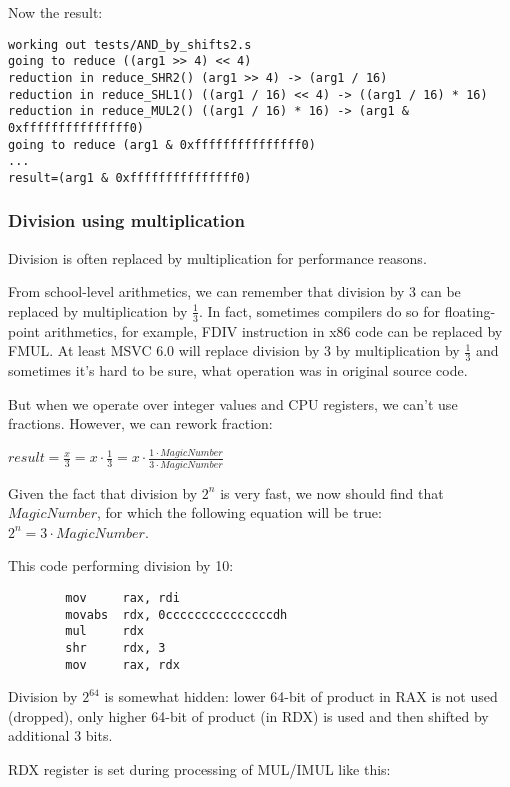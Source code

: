 Now the result:

\begin{lstlisting}
working out tests/AND_by_shifts2.s
going to reduce ((arg1 >> 4) << 4)
reduction in reduce_SHR2() (arg1 >> 4) -> (arg1 / 16)
reduction in reduce_SHL1() ((arg1 / 16) << 4) -> ((arg1 / 16) * 16)
reduction in reduce_MUL2() ((arg1 / 16) * 16) -> (arg1 & 0xfffffffffffffff0)
going to reduce (arg1 & 0xfffffffffffffff0)
...
result=(arg1 & 0xfffffffffffffff0)
\end{lstlisting}

\subsubsection{Division using multiplication}

Division is often replaced by multiplication for performance reasons.

From school-level arithmetics, we can remember that division by 3 can be replaced by multiplication by $\frac{1}{3}$.
In fact, sometimes compilers do so for floating-point arithmetics, for example, FDIV instruction in x86 code
can be replaced by FMUL.
At least MSVC 6.0 will replace division by 3 by multiplication by $\frac{1}{3}$ and sometimes it's hard to be sure,
what operation was in original source code.

But when we operate over integer values and CPU registers, we can't use fractions.
However, we can rework fraction:

\begin{center}
{\large $result = \frac{x}{3} = x \cdot \frac{1}{3} = x \cdot \frac{1 \cdot MagicNumber}{3 \cdot MagicNumber}$}
\end{center}

Given the fact that division by $2^n$ is very fast, we now should find that $MagicNumber$, for which the following
equation will be true: $2^n = 3 \cdot MagicNumber$.

This code performing division by 10:

\begin{lstlisting}
        mov     rax, rdi
        movabs  rdx, 0cccccccccccccccdh
        mul     rdx
        shr     rdx, 3
        mov     rax, rdx
\end{lstlisting}

Division by $2^{64}$ is somewhat hidden: lower 64-bit of product in RAX is not used (dropped), only higher 64-bit of
product (in RDX) is used and then shifted by additional 3 bits.

RDX register is set during processing of MUL/IMUL like this:

